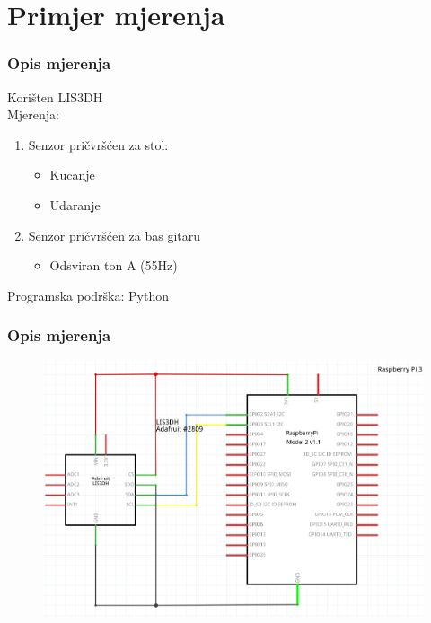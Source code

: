 \documentclass[12pt]{beamer}
\begin{document}
\section{Primjer mjerenja}
\begin{frame}
	\frametitle{Opis mjerenja}
	Korišten LIS3DH \\
	Mjerenja:
	\begin{enumerate}
		\item Senzor pričvršćen za stol:
		\begin{itemize}
			\item Kucanje
			\item Udaranje
		\end{itemize}
		\item Senzor pričvršćen za bas gitaru
			\begin{itemize}
			\item Odsviran ton A (55Hz)
		\end{itemize}
	\end{enumerate}
	Programska podrška: Python
\end{frame}

\begin{frame}
	\frametitle{Opis mjerenja}
	\begin{figure}[h]
		\centering
		\includegraphics[width=0.8\linewidth]{slike/lisRpiI2C.png}
	\end{figure}
\end{frame}
\end{document}
